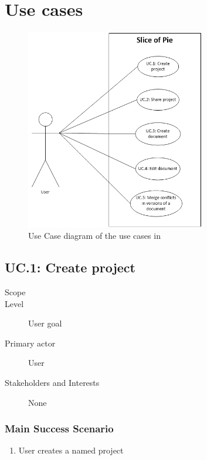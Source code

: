 \section{Use cases}
\label{sec:use-cases}

\begin{figure}[htb]
	\centering
	\includegraphics[width=0.7\textwidth]{Appendices/graphics/use-cases-01.png}
	\caption{Use Case diagram of the use cases in \SOP{}}
	\label{fig:use-cases-01}
\end{figure}

\subsection{UC.1: Create project}
\begin{description}
    \item[Scope] \SOP{}
    \item[Level] User goal
    \item[Primary actor] User
    \item[Stakeholders and Interests] None
\end{description}
    
\subsubsection{Main Success Scenario}
\begin{enumerate}
    \item User creates a named project
\end{enumerate}
    
